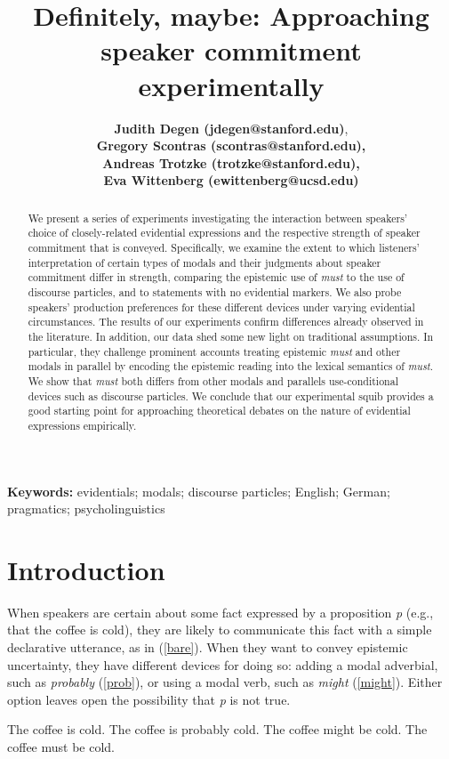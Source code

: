 \documentclass[11pt]{article}
\title{Definitely, maybe: Approaching speaker commitment experimentally}
\author{{\large \bf Judith Degen (jdegen@stanford.edu)}, \\ {\large \bf Gregory Scontras (scontras@stanford.edu),}\\ {\large \bf Andreas Trotzke (trotzke@stanford.edu),}\\ {\large \bf Eva Wittenberg (ewittenberg@ucsd.edu)}}
\begin{document}
\maketitle

\begin{abstract}

We present a series of experiments investigating the interaction between speakers’ choice of closely-related evidential expressions and the respective strength of speaker commitment that is conveyed. Specifically, we examine the extent to which listeners' interpretation of certain types of modals and their judgments about speaker commitment differ in strength, comparing the epistemic use of \emph{must} to the use of discourse particles, and to statements with no evidential markers. We also probe speakers' production preferences for these different devices under varying evidential circumstances. The results of our experiments confirm differences already observed in the literature. In addition, our data shed some new light on traditional assumptions. In particular, they challenge prominent accounts treating epistemic \emph{must} and other modals in parallel by encoding the epistemic reading into the lexical semantics of \emph{must}. We show that \emph{must} both differs from other modals and parallels use-conditional devices such as discourse particles. We conclude that our experimental squib provides a good starting point for approaching theoretical debates on the nature of evidential expressions empirically.

\end{abstract}

\textbf{Keywords:} 
evidentials; modals; discourse particles; English; German; pragmatics; psycholinguistics


\section{Introduction}

When speakers are certain about some fact expressed by a proposition \emph{p} (e.g., that the coffee is cold), they are likely to communicate this fact with a simple declarative utterance, as in (\ref{bare}). When they want to convey epistemic uncertainty, they have different devices for doing so: adding a modal adverbial, such as \emph{probably} (\ref{prob}), or using a modal verb, such as \emph{might} (\ref{might}). Either option leaves open the possibility that \emph{p} is not true.

\begin{exe}
	\ex\label{english} \begin{xlist}
		\ex\label{bare} The coffee is cold.
		\ex\label{prob} The coffee is probably cold.
		\ex\label{might} The coffee might be cold.
		\ex\label{must} The coffee must be cold.
	\end{xlist}
\end{exe}
\end{document}
